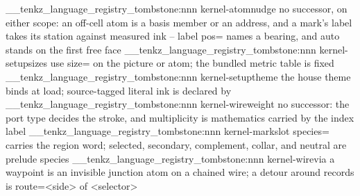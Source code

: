 %
\__tenkz_language_registry_tombstone:nnn {kernel-atom}{nudge}
  {no successor, on either scope: an off-cell atom is a basis member or
    an address, and a mark's label takes its station against measured
    ink -- label pos= names a bearing, and auto stands on the first
    free face}
%
\__tenkz_language_registry_tombstone:nnn {kernel-setup}{sizes}
  {use size= on the picture or atom; the bundled metric table is fixed}
%
\__tenkz_language_registry_tombstone:nnn {kernel-setup}{theme}
  {the house theme binds at load; source-tagged literal ink is declared by
    }
%
\__tenkz_language_registry_tombstone:nnn {kernel-wire}{weight}
  {no successor: the port type decides the stroke, and multiplicity is
    mathematics carried by the index label}
%
\__tenkz_language_registry_tombstone:nnn {kernel-mark}{slot}
  {species= carries the region word; selected, secondary, complement,
    collar, and neutral are prelude species}
%
\__tenkz_language_registry_tombstone:nnn {kernel-wire}{via}
  {a waypoint is an invisible junction atom on a chained wire; a detour
    around records is route={<side> of <selector>}}
%
